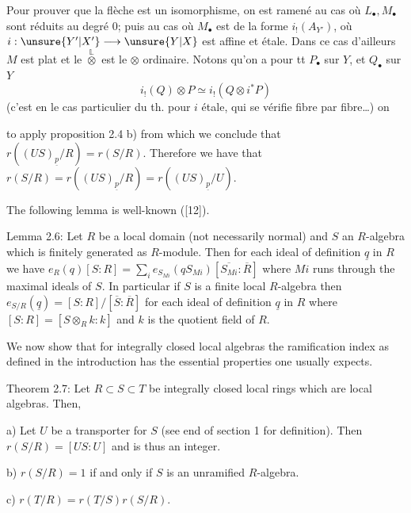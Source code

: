 Pour prouver que la flèche est un isomorphisme,
on est ramené au cas où $L_\bullet,M_\bullet$ sont
réduits au degré $0$;  puis au cas où $M_\bullet$ est
de la forme $i_!(A_{Y'})$, où $i:\unsure{Y'|X'}\longrightarrow\unsure{Y|X}$ est
affine et étale. Dans ce cas d'ailleurs $M$ est
plat et le $\overset{\mathbb L}{\otimes}$ est le $\otimes$ ordinaire. Notons
qu'on a pour tt $P_\bullet$ sur $Y$, et  $Q_\bullet$ sur $Y$
\[
i_!(Q)\otimes P\simeq i_!(Q\otimes i^*P)
\]
(c'est en le cas particulier du th. pour
$i$ étale, qui se vérifie fibre par fibre\ldots) on

to apply proposition 2.4 b) from which we conclude that $r((US)_{\underline p}/R)=r(S/R)$.
Therefore we have that $r(S/R)=r((US)_{\underline p}/R)=r((US)_{\underline p}/U)$.

The following lemma is well-known ([12]).

Lemma 2.6: Let $R$ be a local domain (not necessarily normal) and $S$ an
$R$-algebra which is finitely generated as $R$-module. Then for each ideal of
definition $\underline q$ in $R$ we have $e_R(q)[S:R]=\sum_i e_{S_{Mi}}(qS_{Mi})[\overline{S_{Mi}}:\overline R]$ where $Mi$
runs through the maximal ideals of $S$. In particular if $S$ is a finite local
$R$-algebra then $e_{S/R}(\underline q)=[S:R]/[\overline S:\overline R]$ for each ideal of definition $\underline q$
in $R$ where $[S:R]=[S\otimes_R k:k]$ and $k$ is the quotient field of $R$.

We now show that for integrally closed local algebras the ramification
index as defined in the introduction has the essential properties one
usually expects.

Theorem 2.7: Let $R\subset S\subset T$ be integrally closed local rings which are
local algebras. Then,

a) Let $U$ be a transporter for $S$ (see end of section 1 for definition).
Then $r(S/R)=[US:U]$ and is thus an integer.

b) $r(S/R)=1$ if and only if $S$ is an unramified $R$-algebra.

c) $r(T/R)=r(T/S)r(S/R)$.

